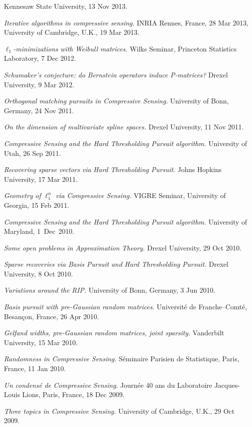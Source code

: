 \documentclass[11pt]{article}
\begin{document}
Kennesaw State University, 13 Nov 2013.
\item {\sl Iterative algorithms in compressive sensing.} INRIA Rennes, France, 28 Mar 2013,
University of Cambridge, U.K., 19 Mar 2013. 
\item {\sl $\ell_1$-minimizations with Weibull matrices.} Wilks Seminar, Princeton Statistics Laboratory, 7 Dec 2012.
\item {\sl Schumaker's conjecture: do Bernstein operators induce P-matrices?} Drexel University, 9 Mar 2012.
\item {\sl Orthogonal matching pursuits in Compressive Sensing.} University of Bonn, Germany, 24 Nov 2011.
\item {\sl On the dimension of multivariate spline spaces.} Drexel University, 11 Nov 2011.
\item {\sl Compressive Sensing and the Hard Thresholding Pursuit algorithm.} University of Utah, 26 Sep 2011.
\item {\sl Recovering sparse vectors via Hard Thresholding Pursuit.} Johns Hopkins University, 17 Mar 2011.
\item {\sl Geometry of $\ell_1^n$ via Compressive Sensing.} VIGRE Seminar, University of Georgia, 15 Feb 2011.
\item {\sl Compressive Sensing and the Hard Thresholding Pursuit algorithm.\hspace{-1.5mm}}  University of Maryland, 1~Dec~2010.
\item {\sl Some open problems in Approximation Theory.} Drexel University, 29 Oct 2010.
\item {\sl Sparse recoveries via Basis Pursuit and Hard Thresholding Pursuit.} Drexel University, 8 Oct 2010.
\item {\sl Variations around the RIP.} University of Bonn, Germany, 3 Jun 2010.
\item {\sl Basis pursuit with pre-Gaussian random matrices.} 
Universit\'e de Franche--Comt\'e, Besan\c{c}on, France, 26 Apr 2010.
\item {\sl Gelfand widths, pre-Gaussian random matrices, joint sparsity.} Vanderbilt University, 15 Mar 2010.
\item {\sl Randomness in Compressive Sensing.} S\'eminaire Parisien de Statistique, Paris, France, 11 Jan 2010.
\item {\sl Un condens\'e de Compressive Sensing.} Journ\'ee 40 ans du Laboratoire Jacques-Louis Lions, Paris, France, 18 Dec 2009.
\item {\sl Three topics in Compressive Sensing.} University of Cambridge, U.K., 29 Oct 2009.
\end{document}
